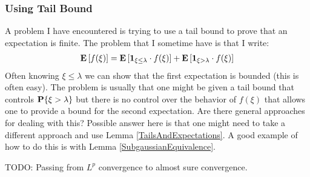 \documentclass{amsart}
\theoremstyle{remark}
\theoremstyle{definition}
\begin{document}
\subsubsection{Using Tail Bound}
A problem I have encountered is trying to use a tail bound to prove
that an expectation is finite.  The problem that I sometime have is
that I write:
\begin{align*}
\textbf{E}\left[f(\xi)\right] = \textbf{E}\left[ \textbf{1}_{\xi \leq \lambda}
  \cdot f(\xi)\right] + \textbf{E}\left[\textbf{1}_{\xi > \lambda} \cdot f(\xi)\right]
\end{align*}
Often knowing $\xi \leq \lambda$ we can show that the first
expectation is bounded (this is often easy).  The problem is usually
that one might be given a tail bound that controls $\textbf{P}\{\xi >
  \lambda\}$ but there is no control over the behavior of $f(\xi)$ that
allows one to provide a bound for the second expectation.  Are there
general approaches for dealing with this?  Possible answer here is
that one might need to take a different approach and use Lemma
\ref{TailsAndExpectations}.  A good example of how to do this is with 
Lemma \ref{SubgaussianEquivalence}.

TODO: Passing from $L^p$ convergence to almost sure convergence.
\end{document}
